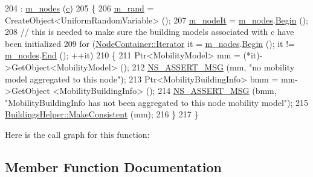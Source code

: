 \begin{DoxyCode}
204   : \hyperlink{classns3_1_1SameRoomPositionAllocator_a3b63686fa8357f8000d82b60d70cf8ef}{m\_nodes} (\hyperlink{lte_2model_2fading-traces_2fading__trace__generator_8m_ae0323a9039add2978bf5b49550572c7c}{c})
205 \{
206   \hyperlink{classns3_1_1SameRoomPositionAllocator_a4aba0af39b8d1e6218271bc5d09b4ba2}{m\_rand} = CreateObject<UniformRandomVariable> ();
207   \hyperlink{classns3_1_1SameRoomPositionAllocator_ad65afb7e5bbad96eeaa1b0a61fc07fba}{m\_nodeIt} = \hyperlink{classns3_1_1SameRoomPositionAllocator_a3b63686fa8357f8000d82b60d70cf8ef}{m\_nodes}.\hyperlink{classns3_1_1NodeContainer_adf0f639aff139db107526288777eb533}{Begin} ();
208   \textcolor{comment}{// this is needed to make sure the building models associated with c have been initialized}
209   \textcolor{keywordflow}{for} (\hyperlink{classns3_1_1NodeContainer_aa1a9f2d2b09bfef7d066d3974bca2cc4}{NodeContainer::Iterator} it = \hyperlink{classns3_1_1SameRoomPositionAllocator_a3b63686fa8357f8000d82b60d70cf8ef}{m\_nodes}.\hyperlink{classns3_1_1NodeContainer_adf0f639aff139db107526288777eb533}{Begin} (); it != 
      \hyperlink{classns3_1_1SameRoomPositionAllocator_a3b63686fa8357f8000d82b60d70cf8ef}{m\_nodes}.\hyperlink{classns3_1_1NodeContainer_a8ea0bcac137597d192c5e6b95ca60464}{End} (); ++it)
210     \{
211       Ptr<MobilityModel> mm = (*it)->GetObject<MobilityModel> ();
212       \hyperlink{assert_8h_aff5ece9066c74e681e74999856f08539}{NS\_ASSERT\_MSG} (mm, \textcolor{stringliteral}{"no mobility model aggregated to this node"});
213       Ptr<MobilityBuildingInfo> bmm = mm->GetObject <MobilityBuildingInfo> ();
214       \hyperlink{assert_8h_aff5ece9066c74e681e74999856f08539}{NS\_ASSERT\_MSG} (bmm, \textcolor{stringliteral}{"MobilityBuildingInfo has not been aggregated to this node mobility
       model"});
215       \hyperlink{classns3_1_1BuildingsHelper_a355b3ae0c0f772746e66fb712c0bc0b0}{BuildingsHelper::MakeConsistent} (mm);
216     \}
217 \}
\end{DoxyCode}


Here is the call graph for this function\+:




\subsection{Member Function Documentation}
